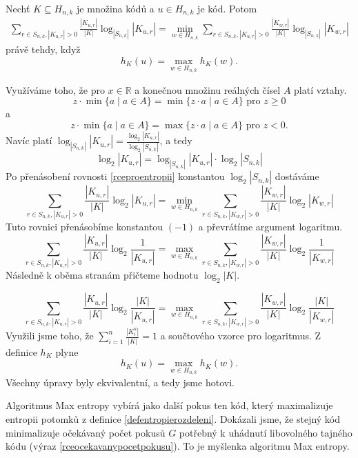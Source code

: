 \begin{veta} \label{vetaekvivalencemaxentropy}
    Nechť $K \subseteq H_{n,k}$ je množina kódů a $u \in H_{n,k}$ je kód. Potom
    \begin{align}\label{rceproentropii}
        \sum_{r\in S_{n,k}, |K_{u,r}| > 0} \frac{|K_{u,r}|}{|K|}\log_{|S_{n,k}|}|K_{u,r}| = \min_{w \in H_{n,k}} \sum_{r\in S_{n,k}, |K_{u,r}| > 0} \frac{|K_{w,r}|}{|K|}\log_{|S_{n,k}|}|K_{w,r}|
    \end{align}
    právě tehdy, když 
    \[h_K(u) = \max_{w \in H_{n,k}} h_K(w).\]
    
\end{veta}
\begin{dukaz} Využíváme toho, že pro $x \in \mathbb{R}$ a konečnou množinu reálných čísel $A$ platí vztahy.
\[z \cdot \min\{a \mid a \in A\} = \min\{z\cdot a \mid a \in A\} \textrm{ pro } z \geq 0\]
a 
\[z \cdot \min \{a \mid a \in A\} = \max\{z\cdot a \mid a \in A\}\textrm{ pro } z < 0.\]
Navíc platí $\log_{|S_{n,k}|} |K_{u,r}| = \frac{\log_2 |K_{u,r}|}{\log_2 |S_{n,k}|}$, a tedy
    \[\log_{2} |K_{u,r}| = \log_{|S_{n,k}|} |K_{u,r}| \cdot \log_2 |S_{n,k}|\]
Po přenásobení rovnosti \ref{rceproentropii} konstantou $\log_2|S_{n,k}|$ dostáváme
\[\sum_{r\in S_{n,k}, |K_{u,r}| > 0} \frac{|K_{u,r}|}{|K|}\log_{2}|K_{u,r}| = \min_{w \in H_{n,k}} \sum_{r\in S_{n,k}, |K_{w,r}| > 0} \frac{|K_{w,r}|}{|K|}\log_{2}|K_{w,r}|\]
Tuto rovnici přenásobíme konstantou $(-1)$ a převrátíme argument logaritmu.
\[\sum_{r\in S_{n,k}, |K_{u,r}| > 0} \frac{|K_{u,r}|}{|K|}\log_{2}\frac{1}{|K_{u,r}|} = \max_{w \in H_{n,k}} \sum_{r\in S_{n,k}, |K_{w,r}| > 0} \frac{|K_{w,r}|}{|K|}\log_{2}\frac{1}{|K_{w,r}|}\]
Následně k oběma stranám přičteme hodnotu $\log_2|K|$.

\[\sum_{r\in S_{n,k}, |K_{u,r}| > 0} \frac{|K_{u,r}|}{|K|}\log_{2}\frac{|K|}{|K_{u,r}|} = \max_{w \in H_{n,k}} \sum_{r\in S_{n,k}, |K_{w,r}| > 0} \frac{|K_{w,r}|}{|K|}\log_{2}\frac{|K|}{|K_{w,r}|}\]
Využili jsme toho, že $\sum_{i=1}^n \frac{|K^u_i|}{|K|} = 1$ a součtového vzorce pro logaritmus. Z definice $h_K$ plyne 
\[h_K(u) = \max_{w \in H_{n,k}}  h_K(w) .\]
Všechny úpravy byly ekvivalentní, a tedy jsme hotovi.
\end{dukaz}

Algoritmus Max entropy vybírá jako další pokus ten kód, který maximalizuje entropii potomků z definice \ref{defentropierozdeleni}. Dokázali jsme, že stejný kód minimalizuje očekávaný počet pokusů $G$ potřebný k uhádnutí libovolného tajného kódu (výraz \ref{rceocekavanypocetpokusu}). To je myšlenka algoritmu Max entropy.

